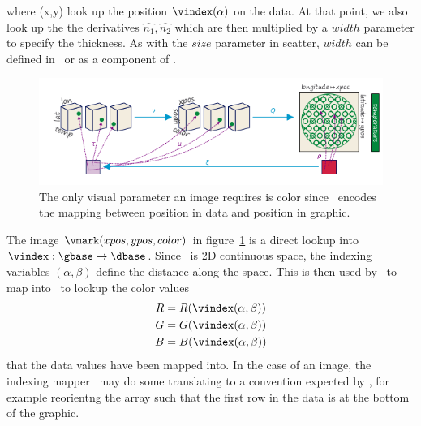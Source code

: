 \documentclass[../main.tex]{subfiles}
\begin{document}
where (x,y) look up the position $\vindex(\alpha)$ on the data. At that point, we also look up the the derivatives $\hat{n_1}, \hat{n_2}$  which are then multiplied by a $width$ parameter to specify the thickness. As with the $size$ parameter in scatter, $width$ can be defined in \vmark\ or as a component of \vtotal. 

\begin{figure}[H]
    \includegraphics[width=\textwidth]{figures/math/image.png}
    \caption{The only visual parameter an image requires is color since \vindex\ encodes the mapping between position in data and position in graphic. }
    \label{fig:artist_heatmap}
\end{figure}

The image $\vmark(xpos, ypos, color)$ in figure~\ref{fig:artist_heatmap} is a direct lookup into  $\vindex:\gbase\rightarrow\dbase$. Since \dbase\ is 2D continuous space, the indexing variables $(\alpha, \beta)$ define the distance along the space. This is then used by \vindex\ to map into \dbase\ to lookup the color values 
\begin{align}
R &= R(\vindex(\alpha, \beta))\\
G &= G(\vindex(\alpha, \beta))\\
B &= B(\vindex(\alpha, \beta))
\end{align}
that the data values have been mapped into. In the case of an image, the indexing mapper \vindex\ may do some translating to a convention expected by \vmark, for example reorientng the array such that the first row in the data is at the bottom of the graphic. 
\end{document}
